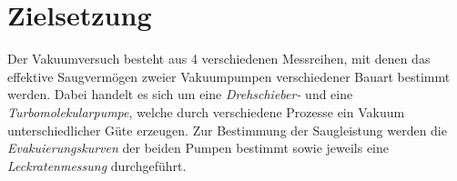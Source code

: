 \section{Zielsetzung}
\label{sec:zielsetzung}
Der Vakuumversuch besteht aus 4 verschiedenen Messreihen,
mit denen das effektive Saugvermögen zweier Vakuumpumpen
verschiedener Bauart bestimmt werden. 
Dabei handelt es sich um eine \textit{Drehschieber-}
und eine \textit{Turbomolekularpumpe},
welche durch verschiedene Prozesse ein Vakuum unterschiedlicher Güte erzeugen. 
Zur Bestimmung der Saugleistung werden die \textit{Evakuierungskurven} der beiden Pumpen bestimmt
sowie jeweils eine \textit{Leckratenmessung} durchgeführt. 